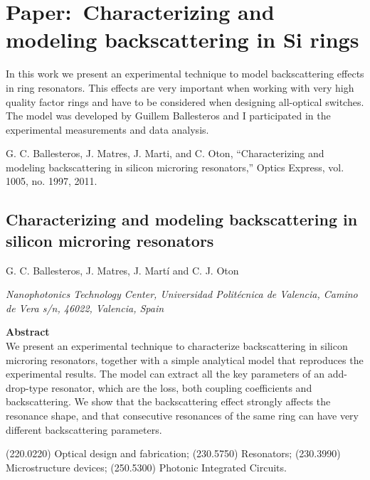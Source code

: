 \chapter{Paper:~Characterizing and modeling backscattering in Si rings}
\label{ch:paperBackscattering}
\pagestyle{plain}

In this work we present an experimental technique to model backscattering effects in ring resonators. This effects are very important when working with very high quality factor rings and have to be considered when designing all-optical switches. The model was developed by Guillem Ballesteros and I participated in the experimental measurements and data analysis.

\vspace{1.5cm}

G. C. Ballesteros, J. Matres, J. Marti, and C. Oton, “Characterizing and modeling backscattering in silicon microring resonators,” Optics Express, vol. 1005, no. 1997, 2011.

\newpage
\begin{center}
\section*{Characterizing and modeling backscattering in silicon microring resonators}
{G. C. Ballesteros, J. Matres, J. Mart\'i and C. J. Oton}

\end{center}
\noindent
\textit{Nanophotonics Technology Center, Universidad Polit\'ecnica de Valencia, Camino de Vera s/n, 46022, Valencia, Spain}

\vspace{0.5cm}

\textbf{Abstract} \\
\noindent
We present an experimental technique to characterize backscattering in silicon microring resonators, together with a simple analytical model that reproduces the experimental results. The model can extract all the key parameters of an add-drop-type resonator, which are the loss, both coupling coefficients and backscattering. We show that the backscattering effect strongly affects the resonance shape, and that consecutive resonances of the same ring can have very different backscattering parameters.

\begin{center}
(220.0220) Optical design and fabrication; (230.5750) Resonators; (230.3990) Microstructure devices; (250.5300) Photonic Integrated Circuits.
\end{center}


